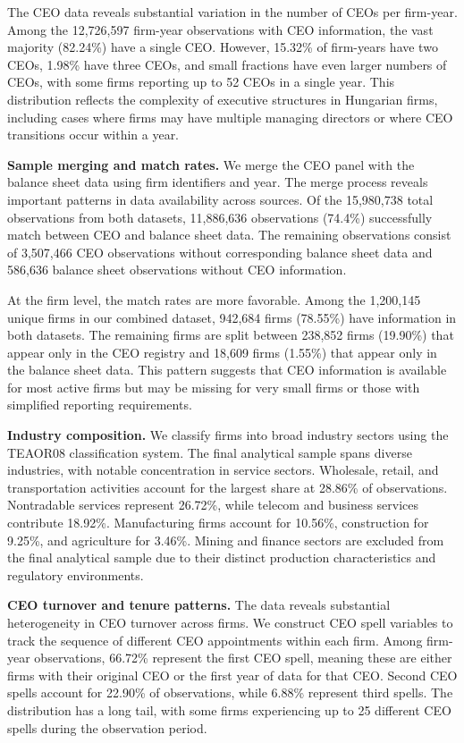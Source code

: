 \documentclass[11pt,a4paper]{article}
\begin{document}
The CEO data reveals substantial variation in the number of CEOs per firm-year. Among the 12,726,597 firm-year observations with CEO information, the vast majority (82.24\%) have a single CEO. However, 15.32\% of firm-years have two CEOs, 1.98\% have three CEOs, and small fractions have even larger numbers of CEOs, with some firms reporting up to 52 CEOs in a single year. This distribution reflects the complexity of executive structures in Hungarian firms, including cases where firms may have multiple managing directors or where CEO transitions occur within a year.

\textbf{Sample merging and match rates.} We merge the CEO panel with the balance sheet data using firm identifiers and year. The merge process reveals important patterns in data availability across sources. Of the 15,980,738 total observations from both datasets, 11,886,636 observations (74.4\%) successfully match between CEO and balance sheet data. The remaining observations consist of 3,507,466 CEO observations without corresponding balance sheet data and 586,636 balance sheet observations without CEO information.

At the firm level, the match rates are more favorable. Among the 1,200,145 unique firms in our combined dataset, 942,684 firms (78.55\%) have information in both datasets. The remaining firms are split between 238,852 firms (19.90\%) that appear only in the CEO registry and 18,609 firms (1.55\%) that appear only in the balance sheet data. This pattern suggests that CEO information is available for most active firms but may be missing for very small firms or those with simplified reporting requirements.

\textbf{Industry composition.} We classify firms into broad industry sectors using the TEAOR08 classification system. The final analytical sample spans diverse industries, with notable concentration in service sectors. Wholesale, retail, and transportation activities account for the largest share at 28.86\% of observations. Nontradable services represent 26.72\%, while telecom and business services contribute 18.92\%. Manufacturing firms account for 10.56\%, construction for 9.25\%, and agriculture for 3.46\%. Mining and finance sectors are excluded from the final analytical sample due to their distinct production characteristics and regulatory environments.

\textbf{CEO turnover and tenure patterns.} The data reveals substantial heterogeneity in CEO turnover across firms. We construct CEO spell variables to track the sequence of different CEO appointments within each firm. Among firm-year observations, 66.72\% represent the first CEO spell, meaning these are either firms with their original CEO or the first year of data for that CEO. Second CEO spells account for 22.90\% of observations, while 6.88\% represent third spells. The distribution has a long tail, with some firms experiencing up to 25 different CEO spells during the observation period.
\end{document}
